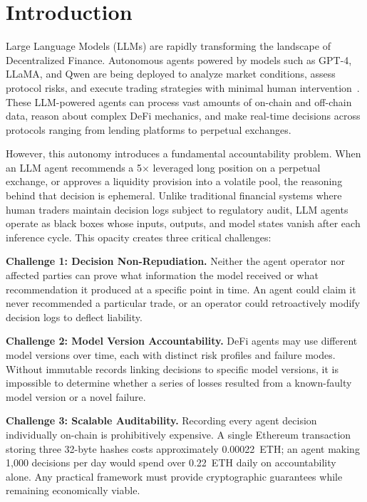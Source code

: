 \documentclass[manuscript,nonacm]{acmart}
\begin{document}
\section{Introduction}
\label{sec:intro}

Large Language Models (LLMs) are rapidly transforming the landscape of Decentralized Finance. Autonomous agents powered by models such as GPT-4, LLaMA, and Qwen are being deployed to analyze market conditions, assess protocol risks, and execute trading strategies with minimal human intervention~\cite{autonomous_agents_blockchain}. These LLM-powered agents can process vast amounts of on-chain and off-chain data, reason about complex DeFi mechanics, and make real-time decisions across protocols ranging from lending platforms to perpetual exchanges.

However, this autonomy introduces a fundamental accountability problem. When an LLM agent recommends a 5$\times$ leveraged long position on a perpetual exchange, or approves a liquidity provision into a volatile pool, the reasoning behind that decision is ephemeral. Unlike traditional financial systems where human traders maintain decision logs subject to regulatory audit, LLM agents operate as black boxes whose inputs, outputs, and model states vanish after each inference cycle. This opacity creates three critical challenges:

\textbf{Challenge 1: Decision Non-Repudiation.} Neither the agent operator nor affected parties can prove what information the model received or what recommendation it produced at a specific point in time. An agent could claim it never recommended a particular trade, or an operator could retroactively modify decision logs to deflect liability.

\textbf{Challenge 2: Model Version Accountability.} DeFi agents may use different model versions over time, each with distinct risk profiles and failure modes. Without immutable records linking decisions to specific model versions, it is impossible to determine whether a series of losses resulted from a known-faulty model version or a novel failure.

\textbf{Challenge 3: Scalable Auditability.} Recording every agent decision individually on-chain is prohibitively expensive. A single Ethereum transaction storing three 32-byte hashes costs approximately 0.00022~ETH; an agent making 1,000 decisions per day would spend over 0.22~ETH daily on accountability alone. Any practical framework must provide cryptographic guarantees while remaining economically viable.
\end{document}
